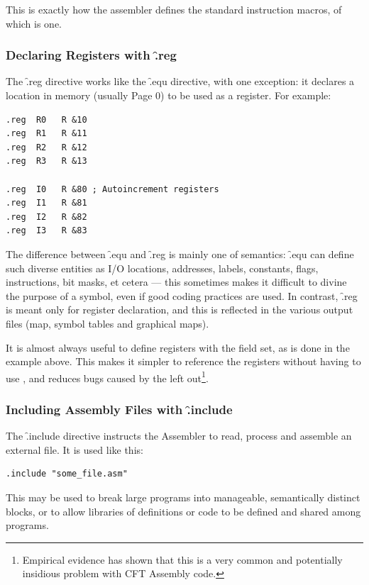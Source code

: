 This is exactly how the assembler defines the standard instruction macros, of
which  is one.



\subsubsection{Declaring Registers with \f{.reg}}

The \f{.reg} directive works like the \f{.equ} directive, with one exception:
it declares a location in memory (usually Page 0) to be used as a register. For
example:

\begin{lstlisting}[language=cftasm]
.reg  R0   R &10
.reg  R1   R &11
.reg  R2   R &12
.reg  R3   R &13

.reg  I0   R &80 ; Autoincrement registers
.reg  I1   R &81
.reg  I2   R &82
.reg  I3   R &83
\end{lstlisting}

The difference between \f{.equ} and \f{.reg} is mainly one of semantics:
\f{.equ} can define such diverse entities as I/O locations, addresses, labels,
constants, flags, instructions, bit masks, et cetera — this sometimes makes it
difficult to divine the purpose of a symbol, even if good coding practices are
used. In contrast, \f{.reg} is meant only for register declaration, and this is
reflected in the various output files (map, symbol tables and graphical maps).

It is almost always useful to define registers with the  field
set, as is done in the example above. This makes it simpler to
reference the registers without having to use , and reduces
bugs caused by the  left out\footnote{Empirical evidence has
  shown that this is a very common and potentially insidious problem
  with CFT Assembly code.}.

\subsubsection{Including Assembly Files with \f{.include}}

The \f{.include} directive instructs the Assembler to read, process and
assemble an external file. It is used like this:

\begin{lstlisting}[language=cftasm,numbers=none]
.include "some_file.asm"
\end{lstlisting}

This may be used to break large programs into manageable, semantically distinct
blocks, or to allow libraries of definitions or code to be defined and shared
among programs.



